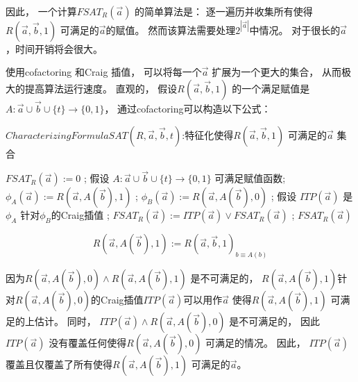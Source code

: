 因此，
一个计算$FSAT_R(\vec{a})$ 的简单算法是：
逐一遍历并收集所有使得$R(\vec{a},\vec{b},1)$ 可满足的$\vec{a}$的赋值。
然而该算法需要处理$2^{|\vec{a}|}$中情况。
对于很长的$\vec{a}$，时间开销将会很大。

使用cofactoring  和Craig 插值，
可以将每一个$\vec{a}$ 扩展为一个更大的集合，
从而极大的提高算法运行速度。
直观的，
假设$R(\vec{a},\vec{b},1)$ 的一个满足赋值是$A:\vec{a}\cup\vec{b}\cup\{t\}\to\{0,1\}$，
通过cofactoring可以构造以下公式：

\begin{algorithm}[t]
\caption{$CharacterizingFormulaSAT(R,\vec{a},\vec{b},t)$:特征化使得$R(\vec{a},\vec{b},1)$ 可满足的$\vec{a}$ 集合}
\label{alg_craigchar}
\begin{algorithmic}[1]
\label{initcondition}
\STATE $FSAT_R(\vec{a}):= 0$ ;
\label{testsat}
  \STATE 假设 $A:\vec{a}\cup\vec{b}\cup\{t\}\rightarrow \{0,1\}$ 可满足赋值函数;
  \STATE $\phi_A(\vec{a}):= R(\vec{a},A(\vec{b}),1)$ ;
\label{cofact1}
  \STATE $\phi_B(\vec{a}):= R(\vec{a},A(\vec{b}),0)$ ;
\label{cofact2}
  \STATE 假设 $ITP(\vec{a})$ 是$\phi_A$ 针对$\phi_B$的Craig插值 ;
\label{ab}
  \STATE $FSAT_R(\vec{a}):= ITP(\vec{a}) \vee FSAT_R(\vec{a})$ ;
\label{add}
\ENDWHILE
\RETURN $FSAT_R(\vec{a})$
\end{algorithmic}
\end{algorithm}

\begin{equation}
R(\vec{a},A(\vec{b}),1):=R(\vec{a},\vec{b},1)_{b\equiv A(b)}
\end{equation}

因为$R(\vec{a},A(\vec{b}),0)\wedge R(\vec{a},A(\vec{b}),1)$ 是不可满足的，
$R(\vec{a},A(\vec{b}),1)$针对$R(\vec{a},A(\vec{b}),0)$的Craig插值$ITP(\vec{a})$可以用作$\vec{a}$ 使得$R(\vec{a},A(\vec{b}),1)$ 可满足的上估计。
同时，
$ITP(\vec{a})\wedge R(\vec{a},A(\vec{b}),0)$ 是不可满足的，
因此$ITP(\vec{a})$ 没有覆盖任何使得$R(\vec{a},A(\vec{b}),0)$ 可满足的情况。
因此，
$ITP(\vec{a})$ 覆盖且仅覆盖了所有使得$R(\vec{a},A(\vec{b}),1)$ 可满足的$\vec{a}$。


